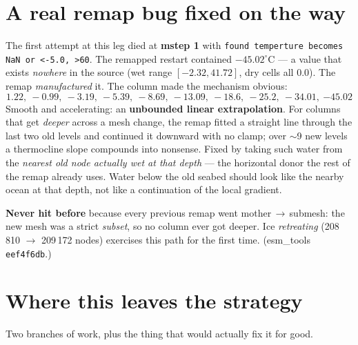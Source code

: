 \documentclass[11pt,a4paper]{article}
\newcommand{\code}[1]{\texttt{\small #1}}
\begin{document}
\section{A real remap bug fixed on the way}\label{sec:extrap}

The first attempt at this leg died at \textbf{mstep 1} with \code{found temperture becomes NaN or
<-5.0, >60}. The remapped restart contained $-45.02^\circ$C --- a value that exists \emph{nowhere} in
the source (wet range $[-2.32, 41.72]$, dry cells all $0.0$). The remap \emph{manufactured} it. The
column made the mechanism obvious:
\[
1.22,\ -0.99,\ -3.19,\ -5.39,\ -8.69,\ -13.09,\ -18.6,\ -25.2,\ -34.01,\ \mathbf{-45.02}
\]
Smooth and accelerating: an \textbf{unbounded linear extrapolation}. For columns that get
\emph{deeper} across a mesh change, the remap fitted a straight line through the last two old levels
and continued it downward with no clamp; over $\sim$9 new levels a thermocline slope compounds into
nonsense. Fixed by taking such water from the \emph{nearest old node actually wet at that depth} ---
the horizontal donor the rest of the remap already uses. Water below the old seabed should look like
the nearby ocean at that depth, not like a continuation of the local gradient.

\textbf{Never hit before} because every previous remap went mother\,$\to$\,submesh: the new mesh was
a strict \emph{subset}, so no column ever got deeper. Ice \emph{retreating} (208\,810 $\to$ 209\,172
nodes) exercises this path for the first time. (esm\_tools \code{eef4f6db}.)

\section{Where this leaves the strategy}

Two branches of work, plus the thing that would actually fix it for good.
\end{document}
